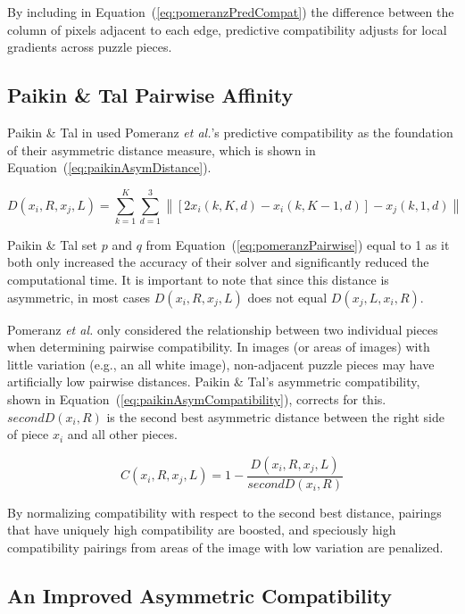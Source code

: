 \documentclass{report}
\def\eref#1{(\ref{#1})}
\newcommand{\norm}[1]{\left\lVert#1\right\rVert}
\begin{document}
By including in Equation~\eref{eq:pomeranzPredCompat} the difference between the column of pixels adjacent to each edge, predictive compatibility adjusts for local gradients across puzzle pieces.

\subsection{Paikin \& Tal Pairwise Affinity}\label{sec:paikinPairwiseAffinity}

Paikin \& Tal in \cite{paikin2015} used Pomeranz \textit{et al.}'s predictive compatibility as the foundation of their asymmetric distance measure, which is shown in Equation~\eref{eq:paikinAsymDistance}.

\begin{equation} \label{eq:paikinAsymDistance}
D(x_i,R,x_j,L) = \sum_{k=1}^{K}\sum_{d=1}^{3} \norm{[2x_i(k, K, d) - x_i(k, K-1, d)] - x_j(k, 1, d)}
\end{equation}

Paikin \& Tal set $p$ and $q$ from Equation~\eref{eq:pomeranzPairwise} equal to 1 as it both only increased the accuracy of their solver and significantly reduced the computational time.  It is important to note that since this distance is asymmetric, in most cases $D(x_i,R,x_j,L)$ does not equal $D(x_j,L,x_i,R)$.

Pomeranz \textit{et al.} only considered the relationship between two individual pieces when determining pairwise compatibility.  In images (or areas of images) with little variation (e.g., an all white image), non-adjacent puzzle pieces may have artificially low pairwise distances.  Paikin \& Tal's asymmetric compatibility, shown in Equation~\eref{eq:paikinAsymCompatibility}, corrects for this.  $secondD(x_i,R)$ is the second best asymmetric distance between the right side of piece $x_i$ and all other pieces. 

\begin{equation} \label{eq:paikinAsymCompatibility}
C(x_i,R,x_j,L) = 1 - \frac{D(x_i,R,x_j,L)}{secondD(x_i,R)}
\end{equation}

\noindent
By normalizing compatibility with respect to the second best distance, pairings that have uniquely high compatibility are boosted, and speciously high compatibility pairings from areas of the image with low variation are penalized.

\subsection{An Improved Asymmetric Compatibility}\label{sec:hammoudehPairwiseAffinity}
\end{document}
